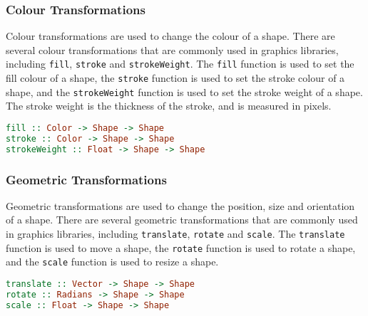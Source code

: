 \documentclass[../main.tex]{subfiles}
\begin{document}
            \subsubsection{Colour Transformations}
                Colour transformations are used to change the colour of a shape.
                There are several colour transformations that are commonly used in graphics
                    libraries, including \verb|fill|, \verb|stroke| and \verb|strokeWeight|.
                The \verb|fill| function is used to set the fill colour of a shape, the
                    \verb|stroke| function is used to set the stroke colour of a shape, and the
                    \verb|strokeWeight| function is used to set the stroke weight of a shape.
                The stroke weight is the thickness of the stroke, and is measured in pixels.

                \begin{lstlisting}[language=Haskell, label={lst:colour}, morekeywords={Shape, Color},
                    caption={The colour transformation functions.}]
fill :: Color -> Shape -> Shape
stroke :: Color -> Shape -> Shape
strokeWeight :: Float -> Shape -> Shape\end{lstlisting}

            \subsubsection{Geometric Transformations}
                Geometric transformations are used to change the position, size and orientation
                    of a shape.
                There are several geometric transformations that are commonly used in graphics
                    libraries, including \verb|translate|, \verb|rotate| and \verb|scale|.
                The \verb|translate| function is used to move a shape, the \verb|rotate|
                    function is used to rotate a shape, and the \verb|scale| function is used to
                    resize a shape.

                \begin{lstlisting}[language=Haskell, label={lst:geometric}, morekeywords={Shape, Vector,
                            Radians}, caption={The geometric transformation functions.}]
translate :: Vector -> Shape -> Shape
rotate :: Radians -> Shape -> Shape
scale :: Float -> Shape -> Shape\end{lstlisting}
\end{document}
